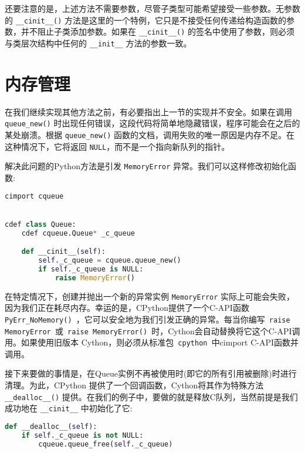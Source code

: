 \begin{translation}
还要注意的是，上述方法不需要参数，尽管子类型可能希望接受一些参数。无参数的 \lstinline{__cinit__()} 方法是这里的一个特例，它只是不接受任何传递给构造函数的参数，并不阻止子类添加参数。如果在 \lstinline{__cinit__()} 的签名中使用了参数，则必须与类层次结构中任何的 \lstinline{__init__} 方法的参数一致。

\section{内存管理}

在我们继续实现其他方法之前，有必要指出上一节的实现并不安全。如果在调用 \lstinline{queue_new()} 时出现任何错误，这段代码将简单地隐藏错误，程序可能会在之后的某处崩溃。根据 \lstinline{queue_new()} 函数的文档，调用失败的唯一原因是内存不足。在这种情况下，它将返回 \lstinline{NULL}，而不是一个指向新队列的指针。

解决此问题的Python方法是引发 \lstinline{MemoryError} 异常。我们可以这样修改初始化函数:

\begin{framed}
\begin{lstlisting}[language=python]
cimport cqueue


cdef class Queue:
    cdef cqueue.Queue* _c_queue

    def __cinit__(self):
        self._c_queue = cqueue.queue_new()
        if self._c_queue is NULL:
            raise MemoryError()
\end{lstlisting}
\end{framed}

在特定情况下，创建并抛出一个新的异常实例 \lstinline{MemoryError} 实际上可能会失败，因为我们正在耗尽内存。幸运的是，CPython提供了一个C-API函数\lstinline{ PyErr_NoMemory() }，它可以安全地为我们引发正确的异常。每当你编写\lstinline{ raise MemoryError }或\lstinline{ raise MemoryError() }时，Cython会自动替换将它这个C-API调用。如果使用旧版本 Cython，则必须从标准包\lstinline{ cpython }中cimport C-API函数并调用。 

接下来要做的事情是，在Queue实例不再被使用时(即它的所有引用被删除)时进行清理。为此，CPython 提供了一个回调函数，Cython将其作为特殊方法 \lstinline{__dealloc__()} 提供。在我们的例子中，要做的就是释放C队列，当然前提是我们成功地在 \lstinline{__cinit__} 中初始化了它:

\begin{framed}
\begin{lstlisting}[language=python]
def __dealloc__(self):
    if self._c_queue is not NULL:
        cqueue.queue_free(self._c_queue)
\end{lstlisting}
\end{framed}


\end{translation}
